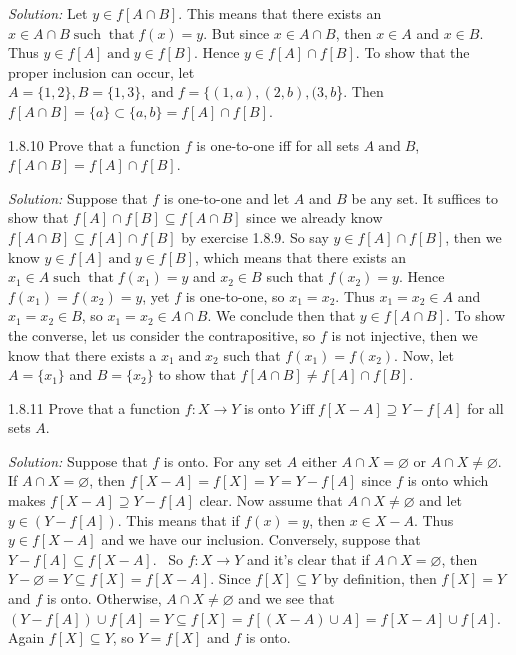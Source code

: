\documentclass{letter}
\newcommand{\tmop}[1]{\ensuremath{\operatorname{#1}}}
\newcommand{\tmtextit}[1]{{\itshape{#1}}}
\begin{document}
\tmtextit{Solution:} Let $y \in f [A \cap B]$. This means that there exists an
$x \in A \cap B \tmop{such} \tmop{that} f (x) = y$. But since $x \in A \cap
B$, then $x \in A$ and $x \in B$. Thus $y \in f [A] \tmop{and} y \in f [B]$.
Hence $y \in f [A] \cap f [B]$. To show that the proper inclusion can occur,
let $A =\{1, 2\}, B =\{1, 3\}, \tmop{and} f =\{(1, a), (2, b), (3, b$\}. Then
$f [A \cap B] =\{a\} \subset \{a, b\}= f [A] \cap f [B]$.

1.8.10 Prove that a function $f$ is one-to-one iff for all sets $A \tmop{and}
B$, $f [A \cap B] = f [A] \cap f [B]$.

\tmtextit{Solution:} Suppose that $f$ is one-to-one and let $A$ and $B$ be any
set. It suffices to show that $f [A] \cap f [B] \subseteq f [A \cap B]$ since
we already know $f [A \cap B] \subseteq f [A] \cap f [B]$ by exercise 1.8.9.
So say $y \in f [A] \cap f [B]$, then we know $y \in f [A] \tmop{and} y \in f
[B]$, which means that there exists an $x_1 \in A \tmop{such} \tmop{that} f
(x_1) = y$ and $x_2 \in B$ such that $f (x_2) = y$. Hence $f (x_1) = f (x_2) =
y$, yet $f$ is one-to-one, so $x_1 = x_2$. Thus $x_1 = x_2 \in A$ and $x_1 =
x_2 \in B$, so $x_1 = x_2 \in A \cap B$. We conclude then that $y \in f [A
\cap B]$. To show the converse, let us consider the contrapositive, so $f$ is
not injective, then we know that there exists a $x_1 \tmop{and} x_2$ such that
$f (x_1) = f (x_2)$. Now, let $A =\{x_1 \}$ and $B =\{x_2 \}$ to show that $f
[A \cap B] \neq f [A] \cap f [B]$.

1.8.11 Prove that a function $f : X \rightarrow Y$ is onto $Y \tmop{iff} f [X
- A] \supseteq Y - f [A]$ for all sets $A$.

\tmtextit{Solution:} Suppose that $f$ is onto. For any set $A$ either $A \cap
X = \varnothing$ or $A \cap X \neq \varnothing$. If $A \cap X = \varnothing$,
then $f [X - A] = f [X] = Y = Y - f [A]$ since $f$ is onto which makes $f [X -
A] \supseteq Y - f [A]$ clear. Now assume that $A \cap X \neq \varnothing$ and
let $y \in (Y - f [A])$. This means that if $f (x) = y$, then $x \in X - A$.
Thus $y \in f [X - A]$ and we have our inclusion. Conversely, suppose that $Y
- f [A] \subseteq f [X - A]$. \ So $f : X \rightarrow Y$ and it's clear that
if $A \cap X = \varnothing$, then $Y - \varnothing = Y \subseteq f [X] = f [X
- A]$. Since $f [X] \subseteq Y$ by definition, then $f [X] = Y$ and $f$ is
onto. Otherwise, $A \cap X \neq \varnothing$ and we see that $(Y - f [A]) \cup
f [A] = Y \subseteq f [X] = f [(X - A) \cup A] = f [X - A] \cup f [A]$. Again
$f [X] \subseteq Y$, so $Y = f [X]$ and $f$ is onto.
\end{document}
